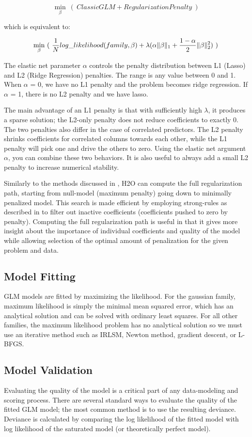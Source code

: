 \[ \min\limits_{\beta}\ (\ Classic GLM  + Regularization Penalty \ )\]

which is equivalent to:

\[ \min\limits_{\beta}\ (\ {{1\over{N}} log\_likelihood(family,\beta)  + \lambda (\alpha \| \beta \|_1} + {1- \alpha \over 2} \| \beta \|_2^2) \ )\]

\bigskip
The elastic net parameter $\alpha$ controls the penalty distribution between L1 (Lasso) and L2 (Ridge Regression)
penalties. The range is any value between 0 and 1. When $\alpha$ = 0, we have no L1 penalty and the problem becomes
ridge regression. If $\alpha$ = 1, there is no L2 penalty and we have lasso.

The main advantage of an L1 penalty is that with sufficiently high $\lambda$, it produces a sparse solution; the
L2-only penalty does not reduce coefficients to exactly 0. The two penalties also differ in the case of correlated
predictors. The L2 penalty shrinks coefficients for correlated columns towards each other, while the L1 penalty
will pick one and drive the others to zero. Using the elastic net argument $\alpha$, you can combine these two
behaviors. It is also useful to always add a small L2 penalty to increase numerical stability.

Similarly to the methods discussed in , H2O can compute the full regularization path, starting
from null-model (maximum penalty) going down to minimally penalized model. This search is made efficient by
employing strong-rules as described in  to filter out inactive coefficients (coefficients pushed
to zero by penalty). Computing the full regularization path is useful in that it gives more insight about the
importance of individual coefficients and quality of the model while allowing selection of the optimal amount of
penalization for the given problem and data.

\subsection{Model Fitting}
GLM models are fitted by maximizing the likelihood. For the gaussian family, maximum likelihood is simply the
minimal mean squared error, which has an analytical solution and can be solved with ordinary least squares. For all
other families, the maximum likelihood problem has no analytical solution so we must use an iterative method such
as IRLSM, Newton method, gradient descent, or L-BFGS.

\subsection{Model Validation}
Evaluating the quality of the model is a critical part of any data-modeling and scoring process. There are several
standard ways to evaluate the quality of the fitted GLM model; the most common method is to use the resulting
deviance. Deviance is calculated by comparing the log likelihood of the fitted model with log likelihood of the
saturated model (or theoretically perfect model).

